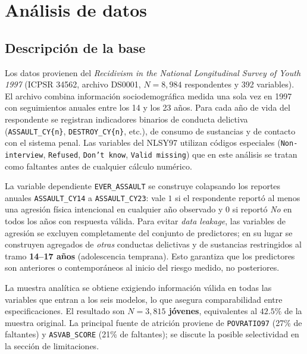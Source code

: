 \documentclass[11pt]{article}
\begin{document}
\section{Análisis de datos}

\subsection{Descripción de la base}

Los datos provienen del \textit{Recidivism in the National Longitudinal Survey of Youth 1997} (ICPSR 34562, archivo DS0001, $N=8{,}984$ respondentes y 392 variables). El archivo combina información sociodemográfica medida una sola vez en 1997 con seguimientos anuales entre los 14 y los 23 años. Para cada año de vida del respondente se registran indicadores binarios de conducta delictiva (\texttt{ASSAULT\_CY\{n\}}, \texttt{DESTROY\_CY\{n\}}, etc.), de consumo de sustancias y de contacto con el sistema penal. Las variables del NLSY97 utilizan códigos especiales (\texttt{Non-interview}, \texttt{Refused}, \texttt{Don't know}, \texttt{Valid missing}) que en este análisis se tratan como faltantes antes de cualquier cálculo numérico.

La variable dependiente \texttt{EVER\_ASSAULT} se construye colapsando los reportes anuales \texttt{ASSAULT\_CY14} a \texttt{ASSAULT\_CY23}: vale $1$ si el respondente reportó al menos una agresión física intencional en cualquier año observado y $0$ si reportó \emph{No} en todos los años con respuesta válida. Para evitar \textit{data leakage}, las variables de agresión se excluyen completamente del conjunto de predictores; en su lugar se construyen agregados de \textit{otras} conductas delictivas y de sustancias restringidos al tramo \textbf{14--17 años} (adolescencia temprana). Esto garantiza que los predictores son anteriores o contemporáneos al inicio del riesgo medido, no posteriores.

La muestra analítica se obtiene exigiendo información válida en todas las variables que entran a los seis modelos, lo que asegura comparabilidad entre especificaciones. El resultado son \textbf{$N = 3{,}815$ jóvenes}, equivalentes al $42.5\%$ de la muestra original. La principal fuente de atrición proviene de \texttt{POVRATIO97} (27\% de faltantes) y \texttt{ASVAB\_SCORE} (21\% de faltantes); se discute la posible selectividad en la sección de limitaciones.
\end{document}
